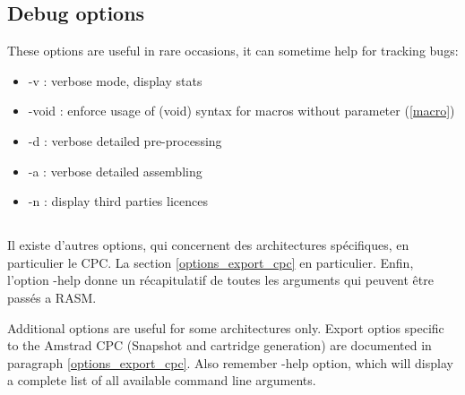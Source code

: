 \begin{xen}
\subsection{Debug options}
These options are useful in rare occasions, it can sometime help for tracking bugs:
\begin{itemize}
\item -v : verbose mode, display stats
\item -void : enforce usage of (void) syntax for macros without parameter (\ref{macro})
\item -d : verbose detailed pre-processing
\item -a : verbose detailed assembling
\item -n : display third parties licences
\end{itemize}

\end{xen}





\subsection{}

\begin{xfr}
  Il existe d'autres options, qui concernent des architectures spécifiques, en particulier le CPC. La section \ref{options_export_cpc} en particulier.
  Enfin, l'option -help donne un récapitulatif de toutes les arguments qui peuvent être passés a RASM.
\end{xfr}

\begin{xen}
  Additional options are useful for some architectures only. Export optios specific to the Amstrad CPC (Snapshot and cartridge generation) are documented in paragraph \ref{options_export_cpc}.
  Also remember -help option, which will display a complete list of all available command line arguments.
\end{xen}
